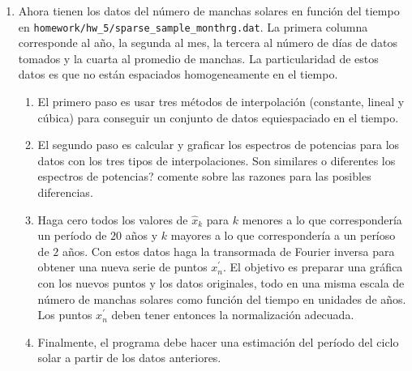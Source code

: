 \documentclass{article}
\begin{document}
\begin{enumerate}
\item
Ahora tienen los datos del n\'umero de manchas solares en funci\'on
del tiempo en \verb"homework/hw_5/sparse_sample_monthrg.dat". La
primera columna corresponde al a\~no, la segunda al mes, la tercera al
n\'umero de d\'ias de datos tomados y la cuarta al promedio de
manchas. La particularidad de estos datos es que no est\'an espaciados
homogeneamente en el tiempo.
\begin{enumerate}

\item
El primero paso es usar tres m\'etodos de interpolaci\'on (constante, lineal y
c\'ubica) para conseguir un conjunto de datos equiespaciado en el
tiempo.

\item

El segundo paso es calcular y graficar los espectros de potencias para
los datos con los tres tipos de interpolaciones. Son similares o
diferentes los espectros de potencias? comente sobre las razones para
las posibles diferencias.


\item
Haga cero todos los valores de $\hat{x}_{k}$ para $k$ menores a lo que
corresponder\'ia un per\'iodo de $20$ a\~nos y $k$ mayores a lo que
corresponder\'ia a un per\'ioso de $2$ a\~nos. Con estos datos haga la
transormada de Fourier inversa para obtener una nueva serie de puntos
$x^{\prime}_{n}$. El objetivo es preparar una gr\'afica con los nuevos
puntos y los datos originales, todo en una misma escala de n\'umero
de manchas solares como funci\'on del tiempo en unidades de a\~nos.
Los puntos $x^{\prime}_{n}$ deben tener entonces la normalizaci\'on
adecuada. 

\item 
Finalmente, el programa debe hacer una estimaci\'on del per\'iodo del
ciclo solar a partir de los datos anteriores.


\end{enumerate}
\end{enumerate}
\end{document}
